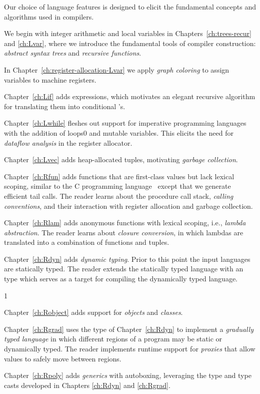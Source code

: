 \documentclass[7x10]{TimesAPriori_MIT}%
\def\racketEd{0}
\def\pythonEd{1}
\def\edition{1}
\newcommand{\racket}[1]{{\if\edition\racketEd{#1}\fi}}
\begin{document}
Our choice of language features is designed to elicit the fundamental
concepts and algorithms used in compilers.
\begin{itemize}
\item We begin with integer arithmetic and local variables in
  Chapters~\ref{ch:trees-recur} and \ref{ch:Lvar}, where we introduce
  the fundamental tools of compiler construction: \emph{abstract
    syntax trees} and \emph{recursive functions}. 
\item In Chapter~\ref{ch:register-allocation-Lvar} we apply
  \emph{graph coloring} to assign variables to machine registers.
\item Chapter~\ref{ch:Lif} adds  expressions, which motivates
  an elegant recursive algorithm for translating them into conditional
  's.
\item Chapter~\ref{ch:Lwhile} fleshes out support for imperative
  programming languages with the addition of loops\racket{ and mutable
  variables}. This elicits the need for \emph{dataflow
    analysis} in the register allocator.
\item Chapter~\ref{ch:Lvec} adds heap-allocated tuples, motivating
  \emph{garbage collection}.
\item Chapter~\ref{ch:Rfun} adds functions that are first-class values
  but lack lexical scoping, similar to the C programming
  language~\citep{Kernighan:1988nx} except that we generate efficient
  tail calls. The reader learns about the procedure call stack,
  \emph{calling conventions}, and their interaction with register
  allocation and garbage collection.
\item Chapter~\ref{ch:Rlam} adds anonymous functions with lexical
  scoping, i.e., \emph{lambda abstraction}. The reader learns about
  \emph{closure conversion}, in which lambdas are translated into a
  combination of functions and tuples.
\item Chapter~\ref{ch:Rdyn} adds \emph{dynamic typing}. Prior to this
  point the input languages are statically typed.  The reader extends
  the statically typed language with an  type which serves
  as a target for compiling the dynamically typed language.
{\if\edition\pythonEd
\item Chapter~\ref{ch:Robject} adds support for \emph{objects} and
  \emph{classes}.
\fi}
\item Chapter~\ref{ch:Rgrad} uses the  type of
  Chapter~\ref{ch:Rdyn} to implement a \emph{gradually typed language}
  in which different regions of a program may be static or dynamically
  typed. The reader implements runtime support for \emph{proxies} that
  allow values to safely move between regions.
\item Chapter~\ref{ch:Rpoly} adds \emph{generics} with autoboxing,
  leveraging the  type and type casts developed in Chapters
  \ref{ch:Rdyn} and \ref{ch:Rgrad}.
\end{itemize}
\end{document}
